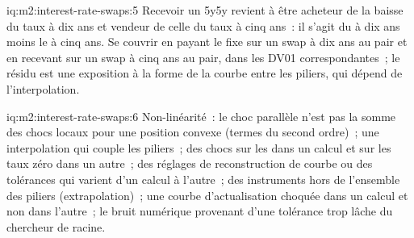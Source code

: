 \begin{solution}{iq:m2:interest-rate-swaps:5}
Recevoir un 5y5y revient à être acheteur de la baisse du taux à dix ans et vendeur de celle du taux à cinq ans~:
il s'agit du  à dix ans moins le  à cinq ans. Se couvrir en payant le fixe
sur un swap à dix ans au pair et en recevant sur un swap à cinq ans au pair, dans les DV01
correspondantes~; le résidu est une exposition à la forme de la courbe entre les
piliers, qui dépend de l'interpolation.
\end{solution}

\begin{solution}{iq:m2:interest-rate-swaps:6}
Non-linéarité~: le choc parallèle n'est pas la somme des chocs locaux pour une
position convexe (termes du second ordre)~; une interpolation qui couple les piliers~;
des chocs sur les  dans un calcul et sur les taux zéro dans un autre~; des réglages
de reconstruction de courbe ou des tolérances qui varient d'un calcul à l'autre~; des instruments hors
de l'ensemble des piliers (extrapolation)~; une courbe d'actualisation choquée dans un calcul et non dans
l'autre~; le bruit numérique provenant d'une tolérance trop lâche du chercheur de racine.
\end{solution}
